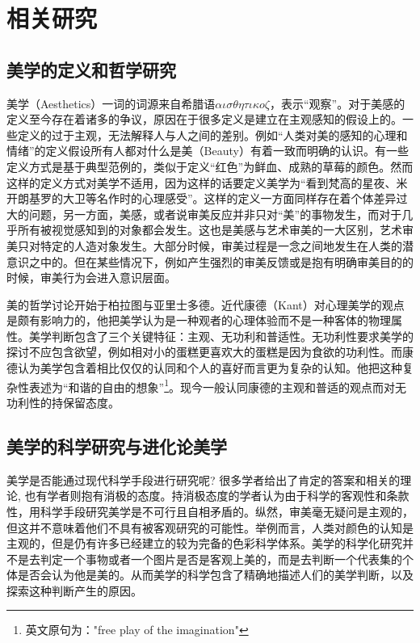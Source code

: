 \chapter{相关研究}
\label{chap:related}

\section{美学的定义和哲学研究}
美学（Aesthetics）一词的词源来自希腊语$\alpha\iota\sigma\theta\eta\tau\iota{\kappa}o\zeta$，表示“观察”。对于美感的定义至今存在着诸多的争议，原因在于很多定义是建立在主观感知的假设上的。一些定义的过于主观，无法解释人与人之间的差别。例如“人类对美的感知的心理和情绪”的定义假设所有人都对什么是美（Beauty）有着一致而明确的认识。有一些定义方式是基于典型范例的，类似于定义“红色”为鲜血、成熟的草莓的颜色。然而这样的定义方式对美学不适用，因为这样的话要定义美学为“看到梵高的星夜、米开朗基罗的大卫等名作时的心理感受”。这样的定义一方面同样存在着个体差异过大的问题，另一方面，美感，或者说审美反应并非只对“美”的事物发生，而对于几乎所有被视觉感知到的对象都会发生。这也是美感与艺术审美的一大区别，艺术审美只对特定的人造对象发生。大部分时候，审美过程是一念之间地发生在人类的潜意识之中的。但在某些情况下，例如产生强烈的审美反馈或是抱有明确审美目的的时候，审美行为会进入意识层面。

美的哲学讨论开始于柏拉图与亚里士多德。近代康德（Kant）对心理美学的观点是颇有影响力的，他把美学认为是一种观者的心理体验而不是一种客体的物理属性。美学判断包含了三个关键特征：主观、无功利和普适性。无功利性要求美学的探讨不应包含欲望，例如相对小的蛋糕更喜欢大的蛋糕是因为食欲的功利性。而康德认为美学包含着相比仅仅的认同和个人的喜好而言更为复杂的认知。他把这种复杂性表述为“和谐的自由的想象”\footnote{英文原句为："free play of the imagination"}。现今一般认同康德的主观和普适的观点而对无功利性的持保留态度。

\section{美学的科学研究与进化论美学}
美学是否能通过现代科学手段进行研究呢? 很多学者给出了肯定的答案和相关的理论, 也有学者则抱有消极的态度。持消极态度的学者认为由于科学的客观性和条款性，用科学手段研究美学是不可行且自相矛盾的。纵然，审美毫无疑问是主观的，但这并不意味着他们不具有被客观研究的可能性。举例而言，人类对颜色的认知是主观的，但是仍有许多已经建立的较为完备的色彩科学体系。美学的科学化研究并不是去判定一个事物或者一个图片是否是客观上美的，而是去判断一个代表集的个体是否会认为他是美的。从而美学的科学包含了精确地描述人们的美学判断，以及探索这种判断产生的原因。

